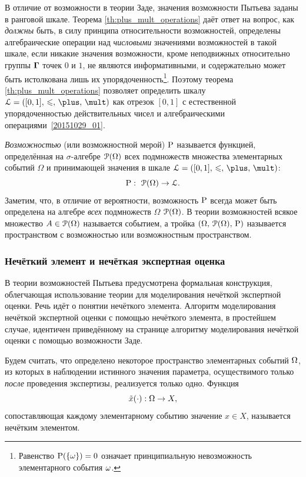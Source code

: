 В отличие от возможности в теории Заде, значения возможности Пытьева заданы в ранговой шкале. Теорема \ref{th:plus_mult_operations} даёт ответ на вопрос, как \emph{должны} быть, в силу принципа относительности возможностей, определены алгебраические операции над \emph{числовыми} значениями возможностей в такой шкале, если никакие значения возможности, кроме неподвижных относительно группы $\bTheta$ точек $0$ и $1$, не являются информативными, и содержательно может быть истолкована лишь их упорядоченность\footnote{Равенство $\P(\{\om\}) = 0$ означает принципиальную невозможность элементарного события $\om$.}. Поэтому теорема \ref{th:plus_mult_operations} позволяет определить шкалу $\scL=\scale$ как отрезок $[0,1]$ с естественной упорядоченностью действительных чисел и алгебраическими операциями~\eqref{20151029_01}.

\emph{Возможностью} (или возможностной мерой) $\P$ называется функцией, определённая на $\sigma$-алгебре $\Po(\Omega)$ всех подмножеств множества элементарных событий $\Omega$ и принимающей значения в шкале $\scL=\scale$:
\begin{equation*}
    \P:\ \Po(\Omega)\to\scL.
\end{equation*}
Заметим, что, в отличие от вероятности, возможность $\P$ всегда может быть определена на алгебре \emph{всех} подмножеств $\Omega$ $\Po(\Omega)$. В теории возможностей всякое множество $A\in\Po(\Omega)$ называется событием, а тройка $\OAP$ называется пространством с возможностью или возможностным пространством. 

\subsubsection{Нечёткий элемент и нечёткая экспертная оценка}

В теории возможностей Пытьева предусмотрена формальная конструкция, облегчающая использование теории для моделирования нечёткой экспертной оценки. Речь идёт о понятии нечёткого элемента. Алгоритм моделирования нечёткой экспертной оценки с помощью нечёткого элемента, в простейшем случае, идентичен приведённому на странице \pageref{zadeh_fuzzy_asset_alg} алгоритму моделирования нечёткой оценки с помощью возможности Заде. 

Будем считать, что определено некоторое пространство элементарных событий $\Om$, из которых в наблюдении истинного значения параметра, осуществимого только \emph{после} проведения экспертизы, реализуется только одно. Функция
\begin{equation*}
	\tilde x(\cdot): \Om \rightarrow X,
\end{equation*} 
сопоставляющая каждому элементарному событию значение $x \in X$, называется нечётким элементом.  

